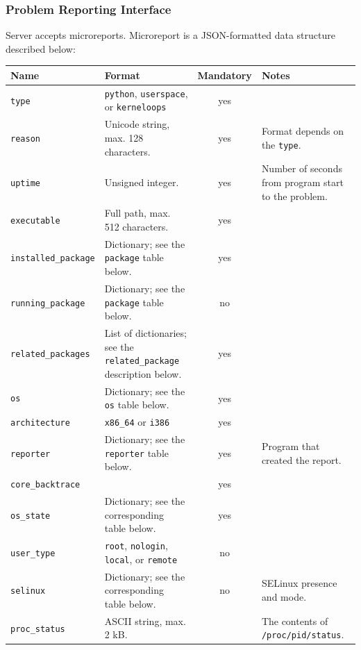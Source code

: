 \documentclass{article}
\begin{document}
\cleardoublepage
\subsubsection{Problem Reporting Interface}

Server accepts microreports.  Microreport is a JSON-formatted data
structure described below:

\begin{flushleft}
\begin{tabular}{|l|p{5cm}|c|p{5cm}|}
\hline
Name & Format & Mandatory & Notes \\ \hline
\texttt{type} & \texttt{python}, \texttt{userspace}, or \texttt{kerneloops} & yes & \\
\texttt{reason} & Unicode string, max. 128 characters. & yes & Format depends on the \texttt{type}. \\
\texttt{uptime} & Unsigned integer. & yes & Number of seconds from program start to the problem. \\
\texttt{executable} & Full path, max. 512 characters. & yes & \\
\texttt{installed\_package} & Dictionary; see the \texttt{package} table below. & yes & \\
\texttt{running\_package} & Dictionary; see the \texttt{package} table below. & no & \\
\texttt{related\_packages} & List of dictionaries; see the \texttt{related\_package} description below. & yes & \\
\texttt{os} & Dictionary; see the \texttt{os} table below. & yes & \\
\texttt{architecture} & \texttt{x86\_64} or \texttt{i386} & yes & \\
\texttt{reporter} & Dictionary; see the \texttt{reporter} table below. & yes & Program that created the report. \\
\texttt{core\_backtrace} & & yes & \\
\texttt{os\_state} & Dictionary; see the corresponding table below. & yes & \\
\texttt{user\_type} & \texttt{root}, \texttt{nologin}, \texttt{local}, or \texttt{remote} & no & \\
\texttt{selinux} & Dictionary; see the corresponding table below. & no & SELinux presence and mode. \\
\texttt{proc\_status} & ASCII string, max. 2 kB. & & The contents of \texttt{/proc/pid/status}. \\
\hline
\end{tabular}
\end{flushleft}
\end{document}
